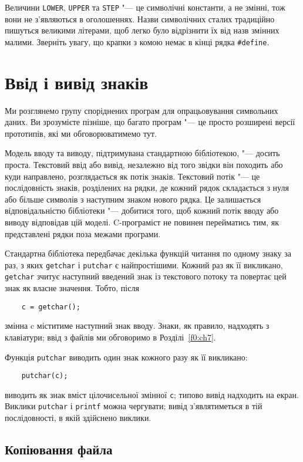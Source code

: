 \documentclass[a4paper,12pt]{book}
\begin{document}
  Величини \texttt{LOWER}, \texttt{UPPER} та \texttt{STEP} "--- це символічні константи, а
  не змінні, тож вони не з'являються в оголошеннях. Назви символічних сталих традиційно
  пишуться великими літерами, щоб легко було відрізнити їх від назв змінних малими.
  Зверніть увагу, що крапки з комою немає в кінці рядка \texttt{\#define}.

\section{Ввід і вивід знаків}


  Ми розглянемо групу споріднених програм для опрацьовування символьних даних. Ви
  зрозумієте пізніше, що багато програм "--- це просто розширені версії прототипів, які ми
  обговорюватимемо тут.

  Модель вводу та виводу, підтримувана стандартною бібліотекою, "--- досить проста.
  Текстовий ввід або вивід, незалежно від того звідки він походить або куди направлено,
  розглядається як потік знаків. Текстовий потік "--- це послідовність знаків, розділених на
  рядки, де кожний рядок складається з нуля або більше символів з наступним знаком нового
  рядка. Це залишається відповідальністю бібліотеки "--- добитися того, щоб кожний потік
  вводу або виводу відповідав цій моделі. C-програміст не повинен перейматись тим, як
  представлені рядки поза межами програми.

  Стандартна бібліотека передбачає декілька функцій читання по одному знаку за раз, з яких
  \texttt{getchar} і \texttt{putchar} є найпростішими. Кожний раз як її викликано,
  \texttt{getchar} зчитує наступний введений знак із текстового потоку та повертає цей
  знак як власне значення. Тобто, після
  \begin{verbatim}
    c = getchar();
  \end{verbatim}
  змінна c міститиме наступний знак вводу. Знаки, як правило, надходять з клавіатури; ввід
  з файлів ми обговоримо в Розділі~\ref{f0:ch7}.

  Функція \texttt{putchar} виводить один знак кожного разу як її викликано:
  \begin{verbatim}
    putchar(c);
  \end{verbatim}
  виводить як знак вміст цілочисельної змінної \texttt{c}; типово вивід надходить на
  екран. Виклики \texttt{putchar} і \texttt{printf} можна чергувати; вивід з'являтиметься
  в тій послідовності, в якій здійснено виклики.

\subsection{Копіювання файла}
\end{document}
